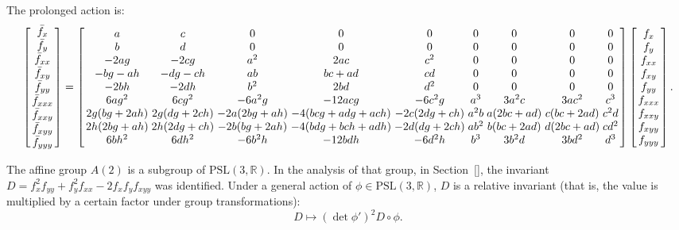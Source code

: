 \documentclass[review,onefignum,onetabnum]{siamonline190516}
\def\R{\mathbb{R}}
\begin{document}
{The prolonged action is:
\begin{equation}
\arraycolsep=1.4pt
\label{eq:prolong}
\left[
\begin{array}{c}
  \bar f_x \\ \bar f_y \\ \bar f_{xx} \\ \bar f_{xy} \\ \bar f_{yy} \\ \bar f_{xxx} \\ \bar f_{xxy} \\ \bar f_{xyy} \\ \bar f_{yyy} 
 \end{array}
 \right]
 = 
\left[
\begin{array}{ccccccccc}
 a & c & 0 & 0 & 0 & 0 & 0 & 0 & 0 \\
 b & d & 0 & 0 & 0 & 0 & 0 & 0 & 0 \\
 -2 a g & -2 c g & a^2 & 2 a c & c^2 & 0 & 0 & 0 & 0 \\
 -b g-a h & -d g-c h & a b & b c+a d & c d & 0 & 0 & 0 & 0 \\
 -2 b h & -2 d h & b^2 & 2 b d & d^2 & 0 & 0 & 0 & 0 \\
 6 a g^2 & 6 c g^2 & -6 a^2 g & -12 a c g & -6 c^2 g & a^3 & 3 a^2 c & 3 a c^2 & c^3 \\
 2 g (b g+2 a h) & 2 g (d g+2 c h) & -2 a (2 b g+a h) & -4 (b c g+a d g+a c h) & -2 c (2 d
   g+c h) & a^2 b & a (2 b c+a d) & c (b c+2 a d) & c^2 d \\
 2 h (2 b g+a h) & 2 h (2 d g+c h) & -2 b (b g+2 a h) & -4 (b d g+b c h+a d h) & -2 d (d g+2
   c h) & a b^2 & b (b c+2 a d) & d (2 b c+a d) & c d^2 \\
 6 b h^2 & 6 d h^2 & -6 b^2 h & -12 b d h & -6 d^2 h & b^3 & 3 b^2 d & 3 b d^2 & d^3 \\
\end{array}
\right]\left[
\begin{array}{c}
f_x \\ f_y \\ f_{xx} \\ f_{xy} \\ f_{yy} \\ f_{xxx} \\ f_{xxy} \\ f_{xyy} \\ f_{yyy} 
 \end{array}
 \right].%
 \end{equation}

The affine group $A(2)$ is a subgroup of $\mathrm{PSL}(3,\R)$. In the analysis of that group, in Section~\ref{}, the invariant $D = f_{x}^2 f_{yy} + f_y^2 f_{xx} - 2 f_x f_y f_{xyy}$ was identified. Under a general action of $\phi \in \mathrm{PSL}(3,\R)$, $D$ is a relative invariant (that is, the value is multiplied by a certain factor under group transformations):
\begin{equation}
\label{eq:D}
D \mapsto (\det \phi')^2 D\circ \phi.
\end{equation}

}
\end{document}
